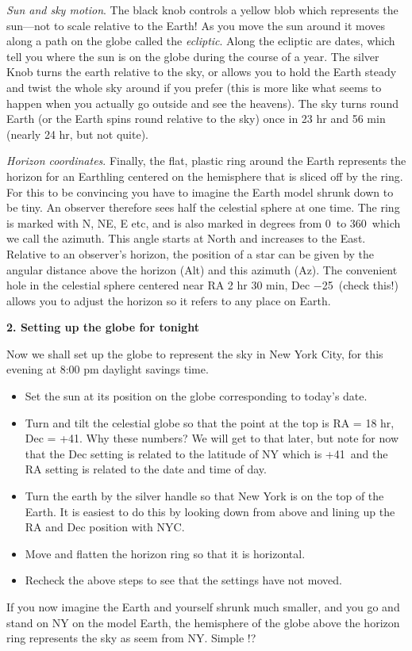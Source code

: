 \medskip\noindent
\emph{Sun and sky motion}.  The black knob controls a yellow blob
which represents the sun---not to scale relative to the Earth! As you
move the sun around it moves along a path on the globe called the
\emph{ecliptic}. Along the ecliptic are dates, which tell you where
the sun is on the globe during the course of a year. The silver Knob
turns the earth relative to the sky, or allows you to hold the Earth
steady and twist the whole sky around if you prefer (this is more like
what seems to happen when you actually go outside and see the
heavens). The sky turns round Earth (or the Earth spins round relative
to the sky) once in 23 hr and 56 min (nearly 24 hr, but not quite).

\medskip\noindent
\emph{Horizon coordinates}.
Finally, the flat, plastic ring around the Earth represents the horizon for
an Earthling centered on the hemisphere that is sliced off by the
ring. For this to be convincing you have to imagine the Earth model
shrunk down to be tiny. An observer therefore sees half the celestial
sphere at one time. The ring is marked with N, NE, E etc, and is also
marked in degrees from 0\deg\ to 360\deg\ which we call the
azimuth. This angle starts at North and increases to the
East. Relative to an observer's horizon, the position of a star can be
given by the angular distance above the horizon (Alt) and this azimuth
(Az). The convenient hole in the celestial sphere centered near RA 2
hr 30 min, Dec $-$25\deg\ (check this!) allows you to adjust the
horizon so it refers to any place on Earth.

\bigskip
\noindent
{\bf 2. Setting up the globe for tonight}

\medskip
\noindent
Now we shall set up the globe to represent the sky in New York City, for this
evening at 8:00 pm daylight savings time.
\begin{itemize}
\item Set the sun at its position on the globe corresponding to
today's date.
\item Turn and tilt the celestial globe so that the point at the top
is RA = 18 hr, Dec = +41\deg. Why these numbers? We will get to that
later, but note for now that the Dec setting is related to the
latitude of NY which is +41\deg\, and the RA setting is related to the
date and time of day.
\item Turn the earth by the silver handle so that New York is on the
top of the Earth. It is easiest to do this by looking down from above
and lining up the RA and Dec position with NYC.
\item Move and flatten the horizon ring so that it is horizontal.
\item Recheck the above steps to see that the settings have not moved.
\end{itemize}
If you now imagine the Earth and yourself shrunk much smaller, and
you go and stand on NY on the model Earth, the hemisphere of the globe above
the horizon ring represents the sky as seem from NY. Simple !?

